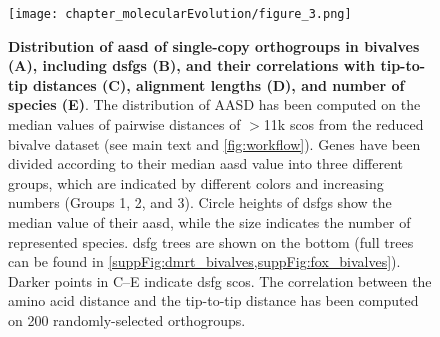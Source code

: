\begin{figure}
	\centering
	\captionsetup[subfigure]{labelformat=nocaption}
	\begin{subfigure}{0\linewidth}
	\caption{}\label{fig:DSFG_bivalveDivergence-A}
	\end{subfigure}%
	\begin{subfigure}{0\linewidth}
	\caption{}\label{fig:DSFG_bivalveDivergence-B}
	\end{subfigure}%
	\begin{subfigure}{0\linewidth}
	\caption{}\label{fig:DSFG_bivalveDivergence-C}
	\end{subfigure}%
	\begin{subfigure}{0\linewidth}
	\caption{}\label{fig:DSFG_bivalveDivergence-D}
	\end{subfigure}%
	\begin{subfigure}{0\linewidth}
	\caption{}\label{fig:DSFG_bivalveDivergence-E}
	\end{subfigure}
	\texttt{[image: chapter\_molecularEvolution/figure\_3.png]}
	\caption[\textbf{Distribution of \gls{aasd} of single-copy orthogroups in bivalves (A), including \glspl{dsfg} (B), and their correlations with tip-to-tip distances (C), alignment lengths (D), and number of species (E)}]
	{
		\textbf{Distribution of \gls{aasd} of single-copy orthogroups in bivalves (A), including \glspl{dsfg} (B), and their correlations with tip-to-tip distances (C), alignment lengths (D), and number of species (E)}. The distribution of AASD has been computed on the median values of pairwise distances of $>$11k \glspl{sco} from the reduced bivalve dataset (see main text and \cref{fig:workflow}). Genes have been divided according to their median \gls{aasd} value into three different groups, which are indicated by different colors and increasing numbers (Groups 1, 2, and 3). Circle heights of \glspl{dsfg} show the median value of their \gls{aasd}, while the size indicates the number of represented species. \gls{dsfg} trees are shown on the bottom (full trees can be found in \cref{suppFig:dmrt_bivalves,suppFig:fox_bivalves}). Darker points in C--E indicate \gls{dsfg} \glspl{sco}. The correlation between the amino acid distance and the tip-to-tip distance has been computed on 200 randomly-selected orthogroups.
	}
	\label{fig:DSFG_bivalveDivergence}
\end{figure}

